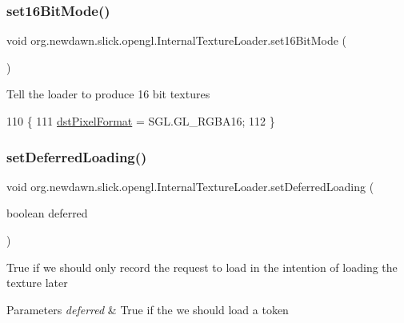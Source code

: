 \subsubsection{\texorpdfstring{set16\+Bit\+Mode()}{set16BitMode()}}
{\footnotesize\ttfamily void org.\+newdawn.\+slick.\+opengl.\+Internal\+Texture\+Loader.\+set16\+Bit\+Mode (\begin{DoxyParamCaption}{ }\end{DoxyParamCaption})\hspace{0.3cm}{\ttfamily [inline]}}

Tell the loader to produce 16 bit textures 
\begin{DoxyCode}
110                                \{
111         \mbox{\hyperlink{classorg_1_1newdawn_1_1slick_1_1opengl_1_1_internal_texture_loader_a38647f15e90386d1a6a3c398f1766611}{dstPixelFormat}} = SGL.GL\_RGBA16;
112     \}
\end{DoxyCode}
\mbox{\label{classorg_1_1newdawn_1_1slick_1_1opengl_1_1_internal_texture_loader_a85712ee47210f31f5605e04dba77b5ab}} 
\subsubsection{\texorpdfstring{set\+Deferred\+Loading()}{setDeferredLoading()}}
{\footnotesize\ttfamily void org.\+newdawn.\+slick.\+opengl.\+Internal\+Texture\+Loader.\+set\+Deferred\+Loading (\begin{DoxyParamCaption}\item[{boolean}]{deferred }\end{DoxyParamCaption})\hspace{0.3cm}{\ttfamily [inline]}}

True if we should only record the request to load in the intention of loading the texture later


\begin{DoxyParams}{Parameters}
{\em deferred} & True if the we should load a token \\
\hline
\end{DoxyParams}

